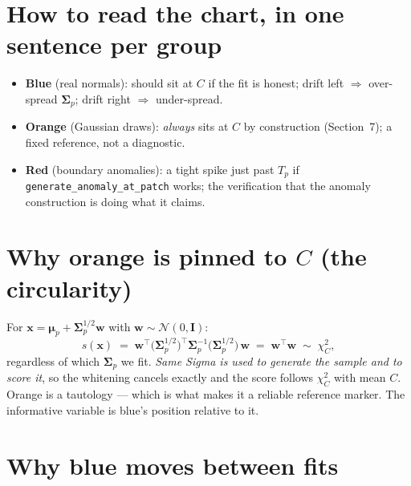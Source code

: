\documentclass[11pt]{article}
\newcommand{\code}[1]{\texttt{#1}}
\newcommand{\bmu}{\boldsymbol{\mu}}
\newcommand{\bSigma}{\boldsymbol{\Sigma}}
\begin{document}
\section{How to read the chart, in one sentence per group}

\begin{itemize}[itemsep=2pt]
  \item \textbf{Blue} (real normals): should sit at $C$ if the fit is honest;
    drift left $\Rightarrow$ over-spread $\bSigma_p$; drift right
    $\Rightarrow$ under-spread.
  \item \textbf{Orange} (Gaussian draws): \emph{always} sits at $C$ by
    construction (Section~7); a fixed reference, not a diagnostic.
  \item \textbf{Red} (boundary anomalies): a tight spike just past $T_p$ if
    \code{generate\_anomaly\_at\_patch} works; the verification that the
    anomaly construction is doing what it claims.
\end{itemize}

\section{Why orange is pinned to $C$ (the circularity)}

For $\mathbf{x} = \bmu_p + \bSigma_p^{1/2}\mathbf{w}$ with
$\mathbf{w} \sim \mathcal{N}(0,\mathbf{I})$:
\begin{equation}
  s(\mathbf{x}) \;=\; \mathbf{w}^\top \bigl(\bSigma_p^{1/2}\bigr)^{\!\top}
  \bSigma_p^{-1} \bigl(\bSigma_p^{1/2}\bigr)\,\mathbf{w}
  \;=\; \mathbf{w}^\top \mathbf{w}
  \;\sim\; \chi^2_{C},
\end{equation}
regardless of which $\bSigma_p$ we fit. \emph{Same Sigma is used to generate
the sample and to score it}, so the whitening cancels exactly and the score
follows $\chi^2_C$ with mean $C$. Orange is a tautology --- which is what makes
it a reliable reference marker. The informative variable is blue's position
relative to it.

\section{Why blue moves between fits}
\end{document}
